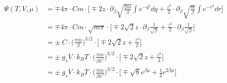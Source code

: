    \begin{align}
        \Psi(T,V,\mu)
        &=\mp 4\pi\cdot Cm\cdot\bigg[
            \mp2z\cdot\partial_\beta
                \sqrt{\frac{2m}{\beta}}
                \int e^{-q^2} \dd q
            +\frac{z^2}{2}\cdot\partial_\beta
                \sqrt{\frac{m}{\beta}}
                \int e^{-r^2} \dd r
        \bigg] \\
        &=\mp 4\pi\cdot Cm\cdot\sqrt{m\pi}\cdot\bigg[
            \mp2\sqrt{2}z\cdot\partial_\beta
                \frac{1}{\sqrt{\beta}}
            +\frac{z^2}{2}\cdot\partial_\beta
                \frac{1}{\sqrt{\beta}}
        \bigg] \\
        &=\pm\ C\cdot
            \bigg(\frac{\pi m}{\beta}\bigg)^{3/2}
            \cdot
        \bigg[
            \mp2\sqrt{2}z
            +\frac{z^2}{2}
        \bigg] \\
        &=\pm\ g_sV\cdot k_BT\cdot
            \bigg(\frac{\pi m}{\beta h^2}\bigg)^{3/2}
            \cdot
        \bigg[
            \mp2\sqrt{2}z
            +\frac{z^2}{2}
        \bigg] \\
        &=\pm\ g_sV\cdot k_BT\cdot
            \bigg(\frac{\pi m}{\beta h^2}\bigg)^{3/2}
            \cdot
        \bigg[
            \mp\sqrt{8}e^{\beta\mu}
            +\frac{1}{2}e^{2\beta\mu}
        \bigg]
    \end{align}

\newpage
